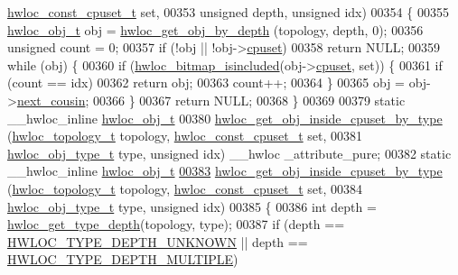 \begin{DoxyCode}
      \hyperlink{a00040_ga1f784433e9b606261f62d1134f6a3b25}{hwloc_const_cpuset_t} \textcolor{keyword}{set},
00353                                       \textcolor{keywordtype}{unsigned} depth, \textcolor{keywordtype}{unsigned} idx)
00354 \{
00355   \hyperlink{a00016}{hwloc_obj_t} obj = \hyperlink{a00047_gaedd78240b0c1108355586a268ec5a697}{hwloc_get_obj_by_depth} (topology, depth, 0);
00356   \textcolor{keywordtype}{unsigned} count = 0;
00357   \textcolor{keywordflow}{if} (!obj || !obj->\hyperlink{a00016_a67925e0f2c47f50408fbdb9bddd0790f}{cpuset})
00358     \textcolor{keywordflow}{return} NULL;
00359   \textcolor{keywordflow}{while} (obj) \{
00360     \textcolor{keywordflow}{if} (\hyperlink{a00065_gaae29e14a926c198e8f91e6e4790621e7}{hwloc_bitmap_isincluded}(obj->\hyperlink{a00016_a67925e0f2c47f50408fbdb9bddd0790f}{cpuset}, \textcolor{keyword}{set})) \{
00361       \textcolor{keywordflow}{if} (count == idx)
00362         \textcolor{keywordflow}{return} obj;
00363       count++;
00364     \}
00365     obj = obj->\hyperlink{a00016_a85a788017457129589318b6c39451acf}{next_cousin};
00366   \}
00367   \textcolor{keywordflow}{return} NULL;
00368 \}
00369 
00379 \textcolor{keyword}{static} \_\_hwloc\_inline \hyperlink{a00016}{hwloc_obj_t}
00380 \hyperlink{a00054_gaa8dcdb85224f7350b90fb0a1ca91e6d6}{hwloc_get_obj_inside_cpuset_by_type} (\hyperlink{a00039_ga9d1e76ee15a7dee158b786c30b6a6e38}{hwloc_topology_t} topology, 
      \hyperlink{a00040_ga1f784433e9b606261f62d1134f6a3b25}{hwloc_const_cpuset_t} \textcolor{keyword}{set},
00381                                      \hyperlink{a00041_gacd37bb612667dc437d66bfb175a8dc55}{hwloc_obj_type_t} type, \textcolor{keywordtype}{unsigned} idx) \_\_hwloc
      \_attribute\_pure;
00382 \textcolor{keyword}{static} \_\_hwloc\_inline \hyperlink{a00016}{hwloc_obj_t}
\hypertarget{a00031_source_l00383}{}\hyperlink{a00054_gaa8dcdb85224f7350b90fb0a1ca91e6d6}{00383} \hyperlink{a00054_gaa8dcdb85224f7350b90fb0a1ca91e6d6}{hwloc_get_obj_inside_cpuset_by_type} (\hyperlink{a00039_ga9d1e76ee15a7dee158b786c30b6a6e38}{hwloc_topology_t} topology, 
      \hyperlink{a00040_ga1f784433e9b606261f62d1134f6a3b25}{hwloc_const_cpuset_t} \textcolor{keyword}{set},
00384                                      \hyperlink{a00041_gacd37bb612667dc437d66bfb175a8dc55}{hwloc_obj_type_t} type, \textcolor{keywordtype}{unsigned} idx)
00385 \{
00386   \textcolor{keywordtype}{int} depth = \hyperlink{a00046_gaea7c64dd59467f5201ba87712710b14d}{hwloc_get_type_depth}(topology, type);
00387   \textcolor{keywordflow}{if} (depth == \hyperlink{a00046_ggaf4e663cf42bbe20756b849c6293ef575a0565ab92ab72cb0cec91e23003294aad}{HWLOC_TYPE_DEPTH_UNKNOWN} || depth == \hyperlink{a00046_ggaf4e663cf42bbe20756b849c6293ef575ae99465995cacde6c210d5fc2e409798c}{HWLOC_TYPE_DEPTH_MULTIPLE})

\end{DoxyCode}

